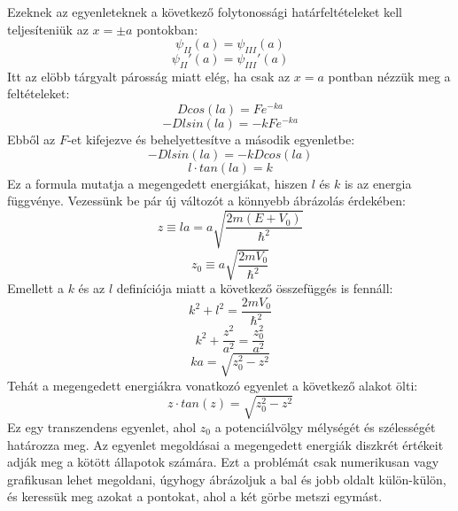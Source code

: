 \documentclass[../main.tex]{subfiles}
\begin{document}
Ezeknek az egyenleteknek a következő folytonossági határfeltételeket kell teljesíteniük az $x = \pm a$ pontokban:
\begin{equation}
    \psi_{II}(a) = \psi_{III}(a)
\end{equation}
\begin{equation}
    \psi_{II}'(a) = \psi_{III}'(a)
\end{equation}
Itt az elöbb tárgyalt párosság miatt elég, ha csak az $x = a$ pontban nézzük meg a feltételeket:
\begin{equation}
    D cos(l a) = F e^{- k a}
\end{equation}
\begin{equation}
    - D l sin(l a) = - k F e^{- k a}
\end{equation}
Ebből az $F$-et kifejezve és behelyettesítve a második egyenletbe:
\begin{equation}
    - D l sin(l a) = - k D cos(l a)
\end{equation}
\begin{equation}
    l \cdot tan(l a) = k
\end{equation}
Ez a formula mutatja a megengedett energiákat, hiszen $l$ és $k$ is az energia függvénye. Vezessünk be pár új változót a könnyebb ábrázolás érdekében:
\begin{equation}
    z \equiv l a = a \sqrt{\frac{2m(E + V_0)}{\hbar^2}}
\end{equation}
\begin{equation}
    z_0 \equiv a \sqrt{\frac{2m V_0}{\hbar^2}}
\end{equation}
Emellett a $k$ és az $l$ definíciója miatt a következő összefüggés is fennáll:
\begin{equation}
    k^2 + l^2 = \frac{2m V_0}{\hbar^2}
\end{equation}
\begin{equation}
    k^2 + \frac{z^2}{a^2} = \frac{z_0^2}{a^2}
\end{equation}
\begin{equation}
    ka = \sqrt{z_0^2 - z^2}
\end{equation}
Tehát a megengedett energiákra vonatkozó egyenlet a következő alakot ölti:
\begin{equation}
    z \cdot tan(z) = \sqrt{z_0^2 - z^2}
\end{equation}
Ez egy transzendens egyenlet, ahol $z_0$ a potenciálvölgy mélységét és szélességét határozza meg. Az egyenlet megoldásai a megengedett energiák diszkrét értékeit adják meg a kötött állapotok számára. 
Ezt a problémát csak numerikusan vagy grafikusan lehet megoldani, úgyhogy ábrázoljuk a bal és jobb oldalt külön-külön, és keressük meg azokat a pontokat, ahol a két görbe metszi egymást.
\end{document}
